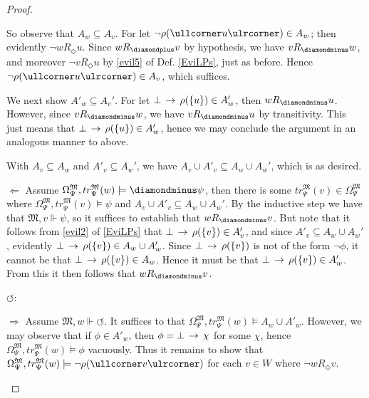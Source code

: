 \documentclass[11pt]{article}
\newcommand{\DD}{\diamondminus}
\newcommand{\DDI}{\diamondplus}
\newcommand{\Pos}{\Diamond}
\newcommand{\lc}{\ullcorner}
\newcommand{\rc}{\ulrcorner}
\begin{document}
\begin{proof}
\begin{peano}
\begin{peano}
	
	So observe that $A_w \subseteq A_v$.  For let $\neg \rho(\lc u\rc) \in  A_w$; then evidently $\neg w R_\Pos u$.  Since $w R_\DDI v$ by hypothesis, we have $v R_\DD w$, and moreover $\neg v R_\Pos u$ by \ref{evil5} of Def. \ref{EviLPs}, just as before.  Hence $\neg \rho(\lc u\rc) \in A_v$, which suffices.
	
	We next show $A'_w \subseteq A_v'$. For let $\bot \,\rightarrow\, \rho(\{ u \}) \in A'_w$, then $w R_\DD u$.  However, since $v R_\DD w$, we have $v R_\DD u$ by transitivity.  This just means that $\bot \,\rightarrow\, \rho(\{ u \}) \in A'_w$, hence we may conclude the argument in an analogous manner to above.
	
	With $A_v \subseteq A_w$ and $A'_v \subseteq A_w'$, we have $A_v \cup A'_v \subseteq A_w \cup A_w'$, which is as desired.
	
	\item $\Leftarrow$  Assume $\Omega_{\Psi}^\mathfrak{M}, tr_{\Psi}^\mathfrak{M}(w) \models \DD\psi$, then there is some $tr_{\Psi}^\mathfrak{M}(v) \in \Omega_{\Psi}^\mathfrak{M}$ where $\Omega_{\Psi}^\mathfrak{M}, tr_{\Psi}^\mathfrak{M}(v) \models \psi$ and $A_v \cup A'_v \subseteq A_w \cup A_w'$.  By the inductive step we have that $\mathfrak{M},v \Vdash \psi$, so it suffices to establish that $w R_\DD v$.  But note that it follows from \ref{evil2} of \ref{EviLPs} that $\bot \,\rightarrow\, \rho(\{v\}) \in A'_v$, and since $A'_v \subseteq A_w \cup A_w'$, evidently $\bot \,\rightarrow\, \rho(\{v\}) \in A_w \cup A_w'$.  Since $\bot \,\rightarrow\, \rho(\{v\})$ is not of the form $\neg \phi$, it cannot be that $\bot \,\rightarrow\, \rho(\{v\})\in A_w$.  Hence it must be that $\bot \,\rightarrow\, \rho(\{v\}) \in A'_w$.  From this it then follows that $w R_\DD v$.
 \end{peano}
 \item $\circlearrowleft$:
 \begin{peano}
 	\item $\Rightarrow$ Assume $\mathfrak{M},w \Vdash \circlearrowleft$.  It suffices to that $\Omega_{\Psi}^\mathfrak{M}, tr_{\Psi}^\mathfrak{M}(w) \models A_w \cup A'_w$.  However, we may observe that if $\phi \in A'_w$, then $\phi = \bot \,\rightarrow\, \chi$ for some $\chi$, hence $\Omega_{\Psi}^\mathfrak{M}, tr_{\Psi}^\mathfrak{M}(w) \models \phi$ vacuously.  Thus it remains to show that $\Omega_{\Psi}^\mathfrak{M}, tr_{\Psi}^\mathfrak{M}(w) \models \neg \rho(\lc v \rc)$ for each $v \in W$ where $\neg w R_\Pos v$.
 

\end{peano}
\end{peano}
\end{proof}
\end{document}
